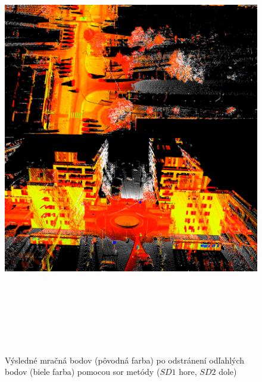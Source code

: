 \newpage\vfill
\begin{figure}[ht]
  \centering
  \includegraphics[width=16cm, height=19cm]{img/outlier_removal.png}
  \caption{Výsledné mračná bodov (pôvodná farba) po odstránení odľahlých bodov (biele farba) pomocou \acrshort{sor} metódy ($SD1$ hore, $SD2$ dole)} 
  \label{fig:outlier}
\end{figure} 
\vfill\clearpage

